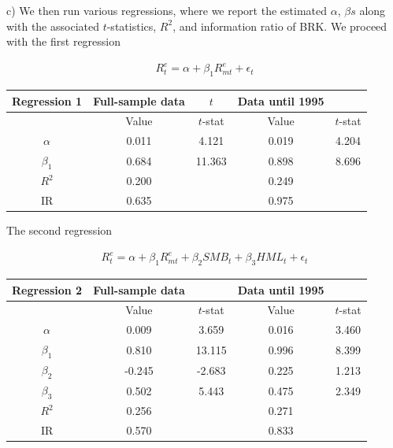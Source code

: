 \documentclass[10pt]{article}
\newenvironment{exercise}[2][Exercise]{\begin{trivlist}
  \item[\hskip \labelsep {\bfseries #1}\hskip \labelsep {\bfseries #2.}]}{\end{trivlist}}
\begin{document}
\begin{exercise}{3}
	(c) We then run various regressions, where we report the estimated $\alpha$, $\beta s$ along with the associated $t$-statistics, $R^{2}$, and information ratio of BRK. We proceed with the first regression
	
	\begin{align*}
		R_{t}^{e} = \alpha + \beta_{1}R^{e}_{mt} + \epsilon_{t} 
	\end{align*}
	
	\begin{table}[h!]
		\centering
 		\begin{tabular}{||c c c c c||} 
 			\hline
 			Regression 1 & Full-sample data & $t$ & Data until 1995 & \\ [0.5ex] 
 			\hline\hline
 		  	& Value & $t$-stat & Value & $t$-stat\\ [0.5ex] 
 			\hline\hline
 			$\alpha$ & 0.011 & 4.121 &  0.019 & 4.204\\ 
 			$\beta_{1}$ & 0.684 & 11.363 & 0.898 & 8.696\\ [1ex]
 			\hline\hline
 			$R^{2}$ & 0.200 & & 0.249 &\\
 			IR & 0.635 & & 0.975 &\\ [1ex] 
 			\hline
		 \end{tabular}
	\end{table}	

	The second regression
	
	\begin{align*}
		R_{t}^{e} = \alpha + \beta_{1}R^{e}_{mt} + \beta_{2}SMB_{t}+ \beta_{3}HML_{t} + \epsilon_{t} 
	\end{align*}
	
	\begin{table}[h!]
		\centering
 		\begin{tabular}{||c c c c c||} 
 			\hline
 			Regression 2 & Full-sample data &  & Data until 1995 & \\ [0.5ex] 
 			\hline\hline
 		  	& Value & $t$-stat & Value & $t$-stat\\ [0.5ex]  
 			\hline\hline
 			$\alpha$ & 0.009 & 3.659 & 0.016 & 3.460\\ 
 			$\beta_{1}$ & 0.810 & 13.115 & 0.996 & 8.399\\
 			$\beta_{2}$ &  -0.245 & -2.683 & 0.225 & 1.213\\
 			$\beta_{3}$ & 0.502 & 5.443 & 0.475 & 2.349\\ [1ex]
 			\hline\hline
 			$R^{2}$ & 0.256 & & 0.271 &\\
 			IR & 0.570 & &  0.833 &\\ [1ex] 
 			\hline
		 \end{tabular}
	\end{table}


\end{exercise}
\end{document}
